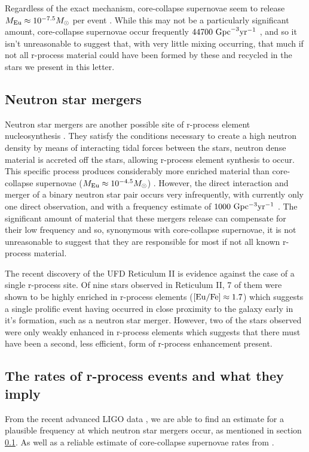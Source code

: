 \documentclass[a4paper,fleqn,usenatbib]{mnras}
\begin{document}
	Regardless of the exact mechanism, core-collapse supernovae seem to release $M_{\rm{Eu}}\approx10^{-7.5} M_{\odot}$ per event \citep{Argast2004} . While this may not be a particularly significant amount, core-collapse supernovae occur frequently $44700\ \rm{Gpc}^{-3} \rm{yr^{-1}}$ \citep{Li2011}, and so it isn't unreasonable to suggest that, with very little mixing occurring, that much if not all r-process material could have been formed by these and recycled in the stars we present in this letter.
	
	\subsection{Neutron star mergers}
	\label{NSmerg}
	Neutron star mergers are another possible site of r-process element nucleosynthesis \citep{Kasen2017,Hotok2013,Drout2017}. They satisfy the conditions necessary to create a high neutron density by means of interacting tidal forces between the stars, neutron dense material is accreted off the stars, allowing r-process element synthesis to occur. This specific process produces considerably more enriched material than core-collapse supernovae ($M_{\rm{Eu}}\approx10^{-4.5} M_{\odot}$) \citep{Goriely2011}. However, the direct interaction and merger of a binary neutron star pair occurs very infrequently, with currently only one direct observation, and with a frequency estimate of $1000\ \rm{Gpc^{-3}yr^{-1}}$ \citep{LIGO2016}. The significant amount of material that these mergers release can compensate for their low frequency and so, synonymous with core-collapse supernovae, it is not unreasonable to suggest that they are responsible for most if not all known r-process material. 

	The recent discovery of the UFD Reticulum II \citep{Ji2016} is evidence against the case of a single r-process site. Of nine stars observed in Reticulum II, 7 of them were shown to be highly enriched in r-process elements ($\rm{[Eu/Fe]\approx1.7}$) which suggests a single prolific event having occurred in close proximity to the galaxy early in it's formation, such as a neutron star merger. However, two of the stars observed were only weakly enhanced in r-process elements which suggests that there must have been a second, less efficient, form of r-process enhancement present.
	
	\subsection{The rates of r-process events and what they imply}
	\label{rates}
	From the recent advanced LIGO data \citep{LIGO2016}, we are able to find an estimate for a plausible frequency at which neutron star mergers occur, as mentioned in section \ref{NSmerg}. As well as a reliable estimate of core-collapse supernovae rates from \citet{Li2011}.
	
\end{document}
